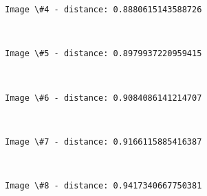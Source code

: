 \documentclass[11pt]{article}
\begin{document}
    \begin{Verbatim}[commandchars=\\\{\}]
Image \#4 - distance: 0.8880615143588726

    \end{Verbatim}

    \begin{center}
    \end{center}
    { \hspace*{\fill} \\}
    
    \begin{Verbatim}[commandchars=\\\{\}]
Image \#5 - distance: 0.8979937220959415

    \end{Verbatim}

    \begin{center}
    \end{center}
    { \hspace*{\fill} \\}
    
    \begin{Verbatim}[commandchars=\\\{\}]
Image \#6 - distance: 0.9084086141214707

    \end{Verbatim}

    \begin{center}
    \end{center}
    { \hspace*{\fill} \\}
    
    \begin{Verbatim}[commandchars=\\\{\}]
Image \#7 - distance: 0.9166115885416387

    \end{Verbatim}

    \begin{center}
    \end{center}
    { \hspace*{\fill} \\}
    
    \begin{Verbatim}[commandchars=\\\{\}]
Image \#8 - distance: 0.9417340667750381

    \end{Verbatim}
\end{document}

